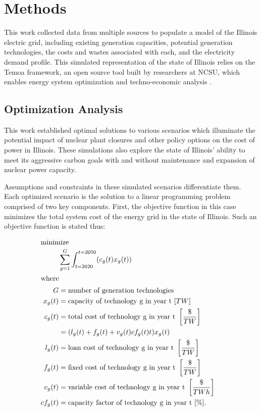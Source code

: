 \section{Methods}\label{sec:methods}
This work collected data from multiple sources to populate a model of the 
Illinois electric grid, including existing generation capacities, potential 
generation technologies, the costs and wastes associated with each, and the 
electricity demand profile. This simulated representation of the state of 
Illinois relies on the Temoa framework, an open source tool built by 
researchers at \gls{NCSU}, which enables energy system optimization and 
techno-economic analysis 
\cite{decarolis_temoa_2010,decarolis_modelling_2016,decarolis_formalizing_2017}.

\subsection{Optimization Analysis}
This work established optimal solutions to 
various scenarios which illuminate the potential impact of nuclear plant 
closures and other policy options on the cost of power in Illinois. These 
simulations  also explore the state of Illinois' ability to meet its aggressive 
carbon goals with and without maintenance and expansion of nuclear power 
capacity. 

Assumptions and constraints in these simulated scenarios differentiate them. 
Each optimized scenario is the solution to a linear programming 
problem  comprised of two key components. First, the objective function in this 
case minimizes the total system cost of the energy grid in the state of 
Illinois. 
Such an objective function is stated thus:

\begin{align}
\intertext{minimize} 
        &\sum_{g=1}^G\int_{t=2020}^{t=2050} (c_g(t)x_g(t))\\
\intertext{where}
        G&=\text{number of generation technologies}&\nonumber\\
        x_g(t)&=\text{capacity of technology g in year t }[TW] &\nonumber\\
        c_g(t)&=\text{total cost of technology g in year t }\left[\frac{\$}{TW}\right]&\nonumber\\
              &= (l_g(t) + f_g(t) + v_g(t)cf_g(t)t)x_g(t)\nonumber\\
        l_g(t)&=\text{loan cost of technology g in year t }\left[\frac{\$}{TW}\right]&\nonumber\\
        f_g(t)&=\text{fixed cost of technology g in year t }\left[\frac{\$}{TW}\right]&\nonumber\\
        v_g(t)&=\text{variable cost of technology g in year t }\left[\frac{\$}{TWh}\right]&\nonumber\\
        cf_g(t)&=\text{capacity factor of technology g in year t }[\%] .&\nonumber
\end{align}

